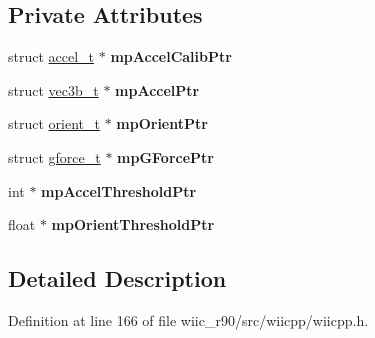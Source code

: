 \subsection*{Private Attributes}
\begin{DoxyCompactItemize}
\item 
\hypertarget{class_c_accelerometer_a66f81dcd2e85d4983f25d3a7cf0c33eb}{struct \hyperlink{structaccel__t}{accel\-\_\-t} $\ast$ {\bfseries mp\-Accel\-Calib\-Ptr}}\label{class_c_accelerometer_a66f81dcd2e85d4983f25d3a7cf0c33eb}

\item 
\hypertarget{class_c_accelerometer_a72fc4ba5b86c18a76c836baecd8e1cc9}{struct \hyperlink{structvec3b__t}{vec3b\-\_\-t} $\ast$ {\bfseries mp\-Accel\-Ptr}}\label{class_c_accelerometer_a72fc4ba5b86c18a76c836baecd8e1cc9}

\item 
\hypertarget{class_c_accelerometer_aef8f0d5ca9ef5befcc6ae9737b41b229}{struct \hyperlink{structorient__t}{orient\-\_\-t} $\ast$ {\bfseries mp\-Orient\-Ptr}}\label{class_c_accelerometer_aef8f0d5ca9ef5befcc6ae9737b41b229}

\item 
\hypertarget{class_c_accelerometer_ac52b9f3128f449b0a599f29aed0e0e59}{struct \hyperlink{structgforce__t}{gforce\-\_\-t} $\ast$ {\bfseries mp\-G\-Force\-Ptr}}\label{class_c_accelerometer_ac52b9f3128f449b0a599f29aed0e0e59}

\item 
\hypertarget{class_c_accelerometer_a3a1f048fa671f9d569d1abed5c6ae65f}{int $\ast$ {\bfseries mp\-Accel\-Threshold\-Ptr}}\label{class_c_accelerometer_a3a1f048fa671f9d569d1abed5c6ae65f}

\item 
\hypertarget{class_c_accelerometer_a879c56d8c16eedfdffdca5023d356efa}{float $\ast$ {\bfseries mp\-Orient\-Threshold\-Ptr}}\label{class_c_accelerometer_a879c56d8c16eedfdffdca5023d356efa}

\end{DoxyCompactItemize}


\subsection{Detailed Description}


Definition at line 166 of file wiic\-\_\-r90/src/wiicpp/wiicpp.\-h.




